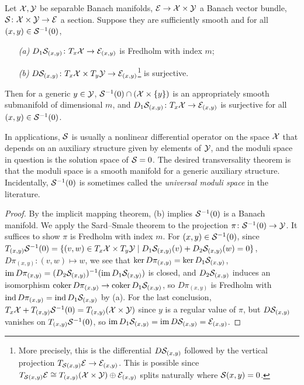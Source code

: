 \begin{theorem}
	Let ${\mathcal{X}}, {\mathcal{Y}}$ be separable Banach manifolds, 
	${\mathcal{E}} \to {\mathcal{X}} \times {\mathcal{Y}}$ a Banach vector bundle, 
	${\mathcal{S}} \colon {\mathcal{X}} \times {\mathcal{Y}} \to {\mathcal{E}}$ a section. 
	Suppose they are sufficiently smooth 
	and for all $(x, y) \in {\mathcal{S}}^{-1} (0)$,
	\begin{enumerate}
		\item[\emph{(a)}]
			$D_1{\mathcal{S}}_{(x, y)} \colon T_x {\mathcal{X}} \to {\mathcal{E}}_{(x, y)}$ 
			is Fredholm with index $m$;
		
		\item[\emph{(b)}] 
			$D{\mathcal{S}}_{(x, y)} \colon T_x {\mathcal{X}} \times T_y {\mathcal{Y}} \to
			{\mathcal{E}}_{(x, y)}$\footnote{More precisely, this is the 
			differential $D{\mathcal{S}}_{(x, y)}$ followed by the vertical 
			projection $T_{{\mathcal{S}}(x, y)} {\mathcal{E}} \to {\mathcal{E}}_{(x, y)}$.
			This is possible since $T_{{\mathcal{S}}(x, y)} {\mathcal{E}} \cong 
			T_{(x, y)} ({\mathcal{X}} \times {\mathcal{Y}}) \oplus {\mathcal{E}}_{(x, y)}$ 
			splits naturally where ${\mathcal{S}}(x,y)=0$.} 
			is surjective.
	\end{enumerate}
	Then for a generic $y \in {\mathcal{Y}}$, 
	${\mathcal{S}}^{-1} (0) \cap ( {\mathcal{X}} \times \{y\} )$ is an appropriately 
	smooth submanifold of dimensional $m$, and 
	$D_1 {\mathcal{S}}_{(x, y)} \colon T_x {\mathcal{X}} \to {\mathcal{E}}_{(x, y)}$ is surjective 
	for all $(x, y) \in {\mathcal{S}}^{-1} (0)$.
\end{theorem}

In applications, ${\mathcal{S}}$ is usually a nonlinear differential operator 
on the space ${\mathcal{X}}$ that depends on an auxiliary structure 
given by elements of ${\mathcal{Y}}$, and the moduli space in question 
is the solution space of ${\mathcal{S}} = 0$. 
The desired transversality theorem is that the moduli space 
is a smooth manifold for a generic auxiliary structure. 
Incidentally, ${\mathcal{S}}^{-1} (0)$ is sometimes called 
the \textit{universal moduli space} in the literature.

\begin{proof}
	By the implicit mapping theorem, 
	(b) implies ${\mathcal{S}}^{-1} (0)$ is a Banach manifold. 
	We apply the Sard--Smale theorem to the projection 
	$\pi \colon {\mathcal{S}}^{-1} (0) \to {\mathcal{Y}}$. 
	It suffices to show $\pi$ is Fredholm with index $m$. 
	For $(x, y) \in {\mathcal{S}}^{-1} (0)$, since 
	$T_{(x, y)} {\mathcal{S}}^{-1} (0) = \{ (v, w) \in T_x {\mathcal{X}} \times T_y {\mathcal{Y}} \mid 
	D_1{\mathcal{S}}_{(x, y)} (v) + D_2{\mathcal{S}}_{(x, y)} (w) = 0 \}$, 
	$D\pi_{(x, y)} \colon (v, w) \mapsto w$, we see that 
	$\ker D\pi_{(x, y)} = \ker D_1{\mathcal{S}}_{(x, y)}$, 
	$\operatorname{im} D\pi_{(x, y)} = (D_2{\mathcal{S}}_{(x, y)})^{-1} (\operatorname{im} D_1{\mathcal{S}}_{(x, y)})$ is closed, 
	and $D_2{\mathcal{S}}_{(x, y)}$ induces an isomorphism 
	$\operatorname{coker} D\pi_{(x, y)} \to \operatorname{coker} D_1{\mathcal{S}}_{(x, y)}$, 
	so $D\pi_{(x, y)}$ is Fredholm with 
	$\operatorname{ind} D\pi_{(x, y)} = \operatorname{ind} D_1{\mathcal{S}}_{(x, y)}$ by (a). 
	For the last conclusion, 
	$T_x {\mathcal{X}} + T_{(x, y)} {\mathcal{S}}^{-1} (0) = T_{(x, y)} ({\mathcal{X}} \times {\mathcal{Y}})$ 
	since $y$ is a regular value of $\pi$, but $D{\mathcal{S}}_{(x, y)}$ vanishes 
	on $T_{(x, y)} {\mathcal{S}}^{-1} (0)$, so 
	$\operatorname{im} D_1{\mathcal{S}}_{(x, y)} = \operatorname{im} D{\mathcal{S}}_{(x, y)} = {\mathcal{E}}_{(x, y)}$.
\end{proof}

